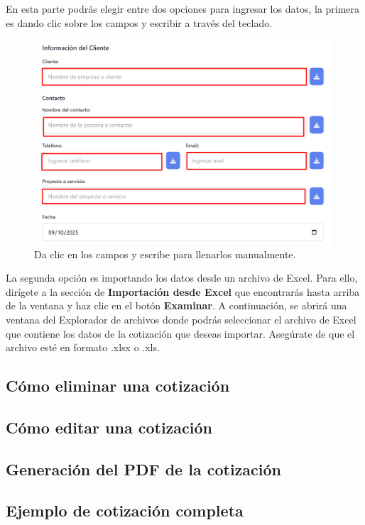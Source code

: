 \documentclass{Pretexto/bluereport}
\begin{document}
En esta parte podrás elegir entre dos opciones para ingresar los datos, la primera es dando clic sobre los campos y escribir a través del teclado.
\begin{figure}[H] 
    \centering
        \includegraphics[width=0.85\linewidth]{img/llenar_campos.png}
    \caption{Da clic en los campos y escribe para llenarlos manualmente.}
    \label{fig:llenado_manual}
\end{figure}
La segunda opción es importando los datos desde un archivo de Excel. Para ello, dirígete a la sección de \textbf{Importación desde Excel} que encontrarás hasta arriba de la ventana y haz clic en el botón \textbf{Examinar}. 
A continuación, se abrirá una ventana del Explorador de archivos donde podrás seleccionar el archivo de Excel que contiene los datos de la cotización que deseas importar. Asegúrate de que el archivo esté en formato .xlsx o .xls.

\subsection{Cómo eliminar una cotización}
\subsection{Cómo editar una cotización}
\subsection{Generación del PDF de la cotización}
\subsection{Ejemplo de cotización completa}
\end{document}
